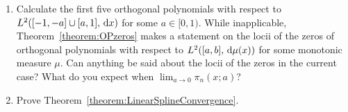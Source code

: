 \begin{enumerate}
\item Calculate the first five orthogonal polynomials with respect to $L^2([-1,-a]\cup[a,1],{\rm\,d} x)$ for some $a\in[0,1)$. While inapplicable, Theorem~\ref{theorem:OPzeros} makes a statement on the locii of the zeros of orthogonal polynomials with respect to $L^2([a,b],{\rm\,d}\mu(x))$ for some monotonic measure $\mu$. Can anything be said about the locii of the zeros in the current case? What do you expect when $\lim_{a\to0}\pi_n(x;a)$?
\item Prove Theorem~\ref{theorem:LinearSplineConvergence}.
\end{enumerate}